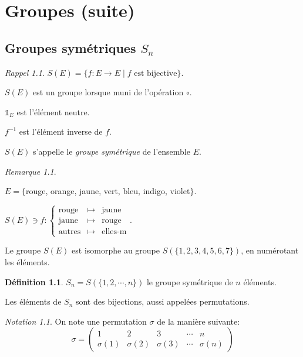 \documentclass{report}
\theoremstyle{definition}
\newtheorem*{defin}{D\'efinition}
\theoremstyle{remark}
\newtheorem*{nota}{Notation}
\newtheorem*{rema}{Remarque}
\newtheorem*{rappel}{Rappel}
\begin{document}
	\setcounter{chapter}{5}
	\chapter{Groupes (suite)}
	\setcounter{section}{12}
	\section{Groupes sym\'etriques $S_n$}
	\begin{rappel}
		$S(E) = \{f:E \to E \mid f \text{ est bijective}\}$.

		$S(E)$ est un groupe lorsque muni de l'op\'eration $\circ$.

		$\mathds{1}_E$ est l'\'el\'ement neutre.

		$f^{-1}$ est l'\'el\'ement inverse de $f$.

		$S(E)$ s'appelle le \emph{groupe sym\'etrique} de l'ensemble $E$.
	\end{rappel}
	\begin{rema}
		~

		$E = \{$rouge, orange, jaune, vert, bleu, indigo, violet$\}$.

		$S(E) \ni f:\left\lbrace \begin{array}{rcl}
			\text{rouge}&\mapsto&\text{jaune}\\
			\text{jaune}&\mapsto&\text{rouge}\\
			\text{autres}&\mapsto&\text{elles-\^m}
		\end{array} \right.$.

		Le groupe $S(E)$ est isomorphe au groupe $S(\{1,2,3,4,5,6,7\})$, en num\'erotant les \'el\'ements.
	\end{rema}
	\begin{defin}
		$S_n = S(\{1,2,\dotsb,n\})$ le groupe sym\'etrique de $n$ \'el\'ements.

		Les \'el\'ements de $S_n$ sont des bijections, aussi appel\'ees permutations.
	\end{defin}
	\begin{nota}
		On note une permutation $\sigma$ de la mani\`ere suivante:
		\[
		\sigma=\begin{pmatrix}
			1&2&3&\dotsb&n\\
			\sigma(1)&\sigma(2)&\sigma(3)&\dotsb&\sigma(n)
		\end{pmatrix}
		\]
	\end{nota}
\end{document}
